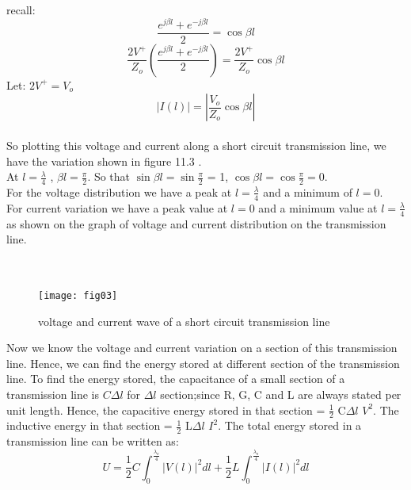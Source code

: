       recall:
     \begin{equation*}
     \frac{e^{j\beta l} + e^{-j\beta l}}{2} = \cos \beta l
     \end{equation*}
     \begin{equation}
     \frac{2V^{+}}{Z_{o}}(\frac{e^{j\beta l} + e^{-j\beta l}}{2}) =\frac{2V^{+}}{Z_{o}}\cos \beta l
     \end{equation}
     Let: $ 2V^{+} = V_{o}$
      \begin{equation}
     \boxed{| I(l) | = \left|\frac{V_{o}}{Z_{o}}\cos \beta l \right|}\end{equation}\\
     So plotting this voltage and current along a short circuit transmission line, we have the variation shown in figure 11.3 . \\
     At $ l = \frac{\lambda}{4}$ , $ \beta l = \frac{\pi}{2} $. So that $\sin \beta l = \sin \frac{\pi}{2}$ = 1, $\cos \beta l = \cos \frac{\pi}{2} = 0$. \\
     For the voltage distribution we have a peak at $ l = \frac{\lambda}{4}$ and a minimum of $ l = 0$.\\ For current variation we have a peak value at  $ l = 0$ and a minimum value at $l = \frac{\lambda}{4}$ as shown on the graph of voltage and current distribution on the transmission line.\\\\\\
     \begin{figure}[h]
     	\centering
     	\texttt{[image: fig03]}
     	\caption{voltage and current wave of a short circuit transmission line }
     
     \end{figure}
  Now we know the voltage and current variation on a section of this transmission line. Hence, we can find the energy stored at different section of the transmission line. To find the energy stored, the capacitance of a small section of a transmission line is $C\Delta l$ for $\Delta l$ section;since R, G, C and L are always stated per unit length. Hence, the capacitive energy stored in that section = $\frac{1}{2}$ C$\Delta $$l$ $ V^{2}$. The inductive energy in that section =  $\frac{1}{2}$ L$\Delta $$l$ $ I^{2}$. The total energy stored in a transmission line can be written as:
  \begin{equation}
  U = \frac{1}{2}C\int_{0}^{\frac{\lambda_{o}}{4}}|V(l)|^{2}dl + \frac{1}{2}L\int_{0}^{\frac{\lambda_{o}}{4}}|I(l)|^{2}dl
  \end{equation}
